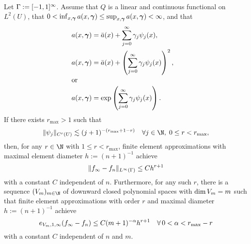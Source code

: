 

\begin{pro}
\label{pro:UQ}
Let $\Gamma:=[-1,1]^{\infty}$.
Assume that $Q$ is a linear and continuous functional on $L^2(U)$, that $0<\inf_{x,\bm{\gamma}}  a(x,\bm{\gamma})\leq \sup_{x,\bm{\gamma}}  a(x,\bm{\gamma})<\infty$, and that
	\begin{align*}
	a(x,\bm{\gamma})&=\bar{a}(x)+\sum_{j=0}^{\infty}\gamma_j\psi_j(x),\\
		a(x,\bm{\gamma})&=\bar{a}(x)+\left(\sum_{j=0}^{\infty}\gamma_j\psi_j(x)\right)^2,\quad \\
	\intertext{or}
		a(x,\bm{\gamma})&=\exp\left(\sum_{j=0}^{\infty}\gamma_j\psi_j(x)\right). 
	\end{align*}
	If there exists $r_{\max}>1$ such that
	\begin{equation*}
	 \|\psi_j\|_{C^{r}(U)}\lesssim (j+1)^{-(r_{\max}+1 - r)}\quad\forall j\in\N, \; 0\leq r< r_{\max},
	 \end{equation*} 
	 	 then, for any $r\in \N$ with $1\leq r< r_{\max}$, finite element approximations with maximal element diameter $h:=(n+1)^{-1}$ achieve
\begin{equation*}
\|f_{\infty}-f_{n}\|_{L^{\infty}(\Gamma)}\leq C h^{r+1}
\end{equation*}
with a constant $C$ independent of $n$.
Furthermore, for any such $r$, there is a sequence $(\vsp_\dvsp)_{\dvsp\in\N}$ of downward closed polynomial spaces with $\dim V_m=m$ such that finite element approximations with order $r$ and maximal diameter $h:=(n+1)^{-1}$ achieve 
\begin{equation*}
e_{V_m,1,\infty}(f_{\infty}-f_n)\leq C(m+1)^{-\alpha}h^{r+1} \quad \forall\, 0<\alpha<r_{\max}- r
\end{equation*}
with a constant $C$ independent of $n$ and $m$.
\end{pro}
